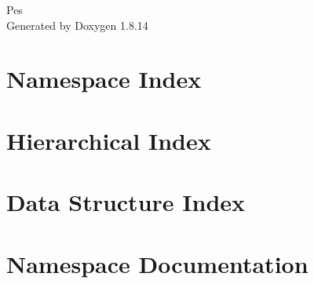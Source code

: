 \documentclass[twoside]{book}
\newcommand{\+}{\discretionary{\mbox{\scriptsize$\hookleftarrow$}}{}{}}
\newcommand{\clearemptydoublepage}{%
  \newpage{\pagestyle{empty}\cleardoublepage}%
}
\begin{document}
\hypersetup{pageanchor=false,
             bookmarksnumbered=true,
             pdfencoding=unicode
            }
\begin{titlepage}
\vspace*{7cm}
\begin{center}%
{\Large Pes }\\
\vspace*{1cm}
{\large Generated by Doxygen 1.8.14}\\
\end{center}
\end{titlepage}
\clearemptydoublepage
{}
\tableofcontents
\clearemptydoublepage
{}
\hypersetup{pageanchor=true}

\chapter{Namespace Index}

\chapter{Hierarchical Index}

\chapter{Data Structure Index}

\chapter{Namespace Documentation}

















\end{document}
